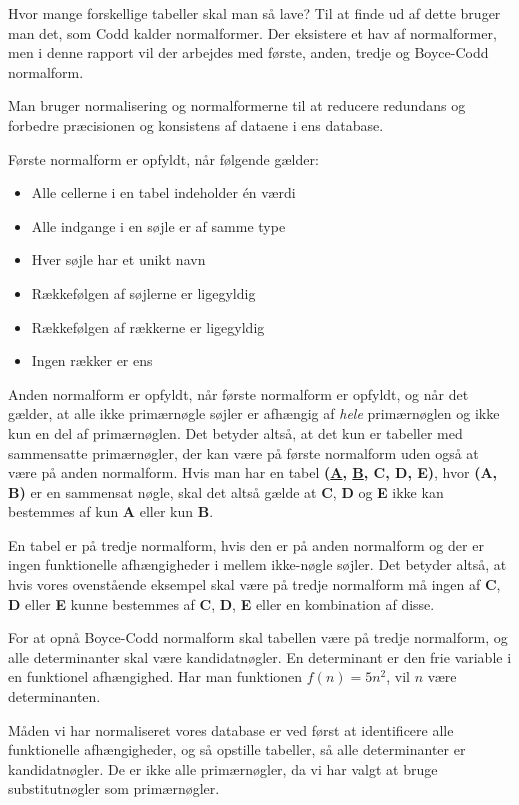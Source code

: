 Hvor mange forskellige tabeller skal man så lave? Til at finde ud af dette bruger man det, som Codd kalder normalformer.
Der eksistere et hav af normalformer, men i denne rapport vil der arbejdes med første, anden, tredje og Boyce-Codd normalform.

Man bruger normalisering og normalformerne til at reducere redundans og forbedre præcisionen og konsistens af dataene i ens database.

Første normalform er opfyldt, når følgende gælder:
\begin{itemize}
    \item Alle cellerne i en tabel indeholder én værdi
    \item Alle indgange i en søjle er af samme type
    \item Hver søjle har et unikt navn
    \item Rækkefølgen af søjlerne er ligegyldig
    \item Rækkefølgen af rækkerne er ligegyldig
    \item Ingen rækker er ens
\end{itemize}

Anden normalform er opfyldt, når første normalform er opfyldt, og når det gælder, at alle ikke primærnøgle søjler er afhængig af \textit{hele} primærnøglen og ikke kun en del af primærnøglen.
Det betyder altså, at det kun er tabeller med sammensatte primærnøgler, der kan være på første normalform uden også at være på anden normalform. Hvis man har en tabel \textbf{(\underline{A}, \underline{B}, C, D, E)}, hvor \textbf{(A, B)} er en sammensat nøgle, skal det altså gælde at \textbf{C}, \textbf{D} og \textbf{E} ikke kan bestemmes af kun \textbf{A} eller kun \textbf{B}.

En tabel er på tredje normalform, hvis den er på anden normalform og der er ingen funktionelle afhængigheder i mellem ikke-nøgle søjler.
Det betyder altså, at hvis vores ovenstående eksempel skal være på tredje normalform må ingen af \textbf{C}, \textbf{D} eller \textbf{E} kunne bestemmes af \textbf{C}, \textbf{D}, \textbf{E} eller en kombination af disse.

For at opnå Boyce-Codd normalform skal tabellen være på tredje normalform, og alle determinanter skal være kandidatnøgler.
En determinant er den frie variable i en funktionel afhængighed. Har man funktionen \(f(n) = 5n^2 \), vil \(n\) være determinanten.\cite{database}

Måden vi har normaliseret vores database er ved først at identificere alle funktionelle afhængigheder, og så opstille tabeller, så alle determinanter er kandidatnøgler.
De er ikke alle primærnøgler, da vi har valgt at bruge substitutnøgler som primærnøgler.


